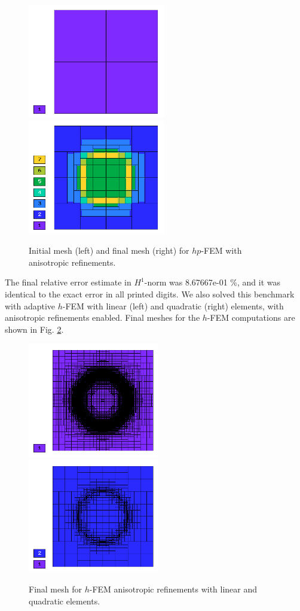 \begin{figure}[!ht]
\centering
\includegraphics[height=5cm]{nist/nist-9/mesh_hp_aniso_init.png}\ \
\includegraphics[height=5cm]{nist/nist-9/mesh_hp_aniso.png}
\vspace{-2mm}
\caption{Initial mesh (left) and final mesh (right) for $hp$-FEM with anisotropic refinements.}
\label{fig:nist-9-hp-aniso}
\end{figure}

The final relative error estimate in $H^1$-norm was 8.67667e-01 \%,
and it was identical to the exact error in all printed digits.
We also solved this benchmark with adaptive $h$-FEM
with linear (left) and quadratic (right)
elements, with anisotropic refinements enabled.
Final meshes for the $h$-FEM computations are shown
in Fig. \ref{fig:nist-9-h-aniso}.

\begin{figure}[!ht]
\centering
\includegraphics[height=5cm]{nist/nist-9/mesh_h1_aniso.png}\ \
\includegraphics[height=5cm]{nist/nist-9/mesh_h2_aniso.png}
\vspace{-2mm}
\caption{Final mesh for $h$-FEM anisotropic refinements with linear and quadratic elements.}
\label{fig:nist-9-h-aniso}
\end{figure}

